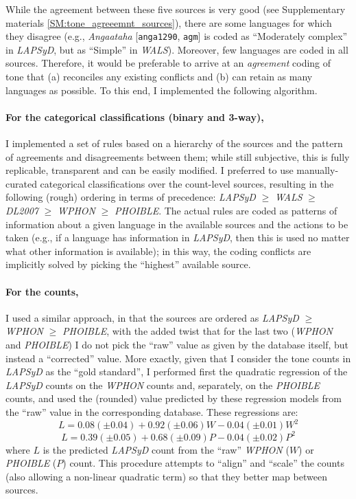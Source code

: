 \documentclass[twoside,onecolumn]{article}
\begin{document}
While the agreement between these five sources is very good (see Supplementary materials \ref{SM:tone_agreeemnt_sources}), there are some languages for which they disagree (e.g., \textit{Angaataha} [\texttt{anga1290}, \texttt{agm}] is coded as ``Moderately complex'' in \textit{LAPSyD}, but as ``Simple'' in \textit{WALS}).
Moreover, few languages are coded in all sources.
Therefore, it would be preferable to arrive at an \emph{agreement} coding of tone that (a) reconciles any existing conflicts and (b) can retain as many languages as possible.
To this end, I implemented the following algorithm.

\paragraph{For the categorical classifications (binary and 3-way),}
I implemented a set of rules based on a hierarchy of the sources and the pattern of agreements and disagreements between them; while still subjective, this is fully replicable, transparent and can be easily modified.
I preferred to use manually-curated categorical classifications over the count-level sources, resulting in the following (rough) ordering in terms of precedence: \textit{LAPSyD} $\geq$ \textit{WALS} $\geq$ \textit{DL2007} $\geq$ \textit{WPHON} $\geq$ \textit{PHOIBLE}.
The actual rules are coded as patterns of information about a given language in the available sources and the actions to be taken (e.g., if a language has information in \textit{LAPSyD}, then this is used no matter what other information is available); in this way, the coding conflicts are implicitly solved by picking the ``highest'' available source.

\paragraph{For the counts,}
I used a similar approach, in that the sources are ordered as \textit{LAPSyD} $\geq$ \textit{WPHON} $\geq$ \textit{PHOIBLE}, with the added twist that for the last two (\textit{WPHON} and \textit{PHOIBLE}) I do not pick the ``raw'' value as given by the database itself, but instead a ``corrected'' value.
More exactly, given that I consider the tone counts in \textit{LAPSyD} as the ``gold standard'', I performed first the quadratic regression of the \textit{LAPSyD} counts on the \textit{WPHON} counts and, separately, on the  \textit{PHOIBLE} counts, and used the (rounded) value predicted by these regression models from the ``raw'' value in the corresponding database.
These regressions are:
$$L = 0.08 (\pm0.04) + 0.92 (\pm0.06)W - 0.04 (\pm0.01)W^2$$
$$L = 0.39 (\pm0.05) + 0.68 (\pm0.09)P - 0.04 (\pm0.02)P^2$$
where $L$ is the predicted \textit{LAPSyD} count from the ``raw'' \textit{WPHON} ($W$) or \textit{PHOIBLE} ($P$) count.
This procedure attempts to ``align'' and ``scale'' the counts (also allowing a non-linear quadratic term) so that they better map between sources.
\end{document}
